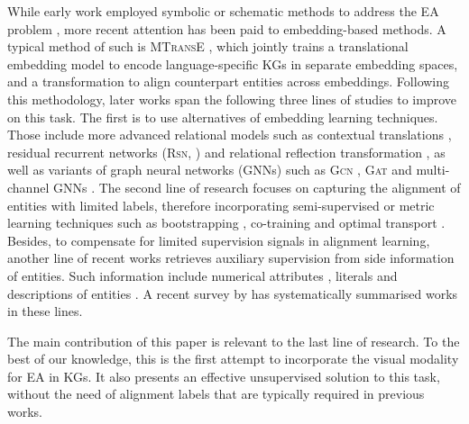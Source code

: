 \documentclass[letterpaper]{article} \usepackage{aaai21}  \usepackage{times}  \usepackage{helvet} \usepackage{courier}  \usepackage[hyphens]{url}  \usepackage{graphicx} \urlstyle{rm} \def\UrlFont{\rm}  \usepackage{natbib}  \usepackage{caption} \frenchspacing  \setlength{\pdfpagewidth}{8.5in}  \setlength{\pdfpageheight}{11in}
\newcommand{\stitle}[1]{\vspace{0.3ex} \noindent{\bf #1}}
\begin{document}
\stitle{Entity alignment.}
While early work employed symbolic or schematic methods to address the EA problem \citep{wijaya2013pidgin,suchanek2011paris},
more recent attention has been paid to embedding-based methods.
A typical method of such is \textsc{MTransE} \citep{chen2017multigraph}, which jointly trains a translational embedding model \citep{bordes2013translating} to encode language-specific KGs in separate embedding spaces, and a transformation to align counterpart entities across embeddings. Following this methodology, later works span the following three lines of studies to improve on this task.
The first is to use alternatives of embedding learning techniques.
Those include more advanced relational models such as contextual translations \citep{sun2019transedge}, residual recurrent networks (\textsc{Rsn}, \citealt{guo2019learning}) and relational reflection transformation \citep{mao2020relational}, as well as variants of graph neural networks (GNNs) such as \textsc{Gcn} \citep{wang2018cross,yang2019aligning,wu2019relation,wu2019jointly}, \textsc{Gat} \citep{sun2020alinet,zhu2019neighborhood} and multi-channel GNNs \citep{cao2019multi}.
The second line of research focuses on capturing the alignment of entities with limited labels, therefore incorporating semi-supervised or metric learning techniques such as bootstrapping \citep{sun2018bootstrapping}, co-training \citep{chen2018co,yang2020cotsae} and optimal transport \citep{pei2019transport}.
Besides, to compensate for limited supervision signals in alignment learning, another line of recent works retrieves auxiliary supervision from side information of entities.
Such information include numerical attributes \citep{sun2017cross,trsedya2019attr}, literals \citep{zhang2019multi,otani2018cross} and descriptions of entities \citep{chen2018co,gesese2019survey}.
A recent survey by \citet{sun2020benchmark} has systematically summarised works in these lines.

The main contribution of this paper is relevant to the last line of research.
To the best of our knowledge, 
this is the first attempt to incorporate the visual modality for EA in KGs.
It also presents an effective unsupervised solution to this task, without the need of alignment labels that are typically required in previous works.
\end{document}
